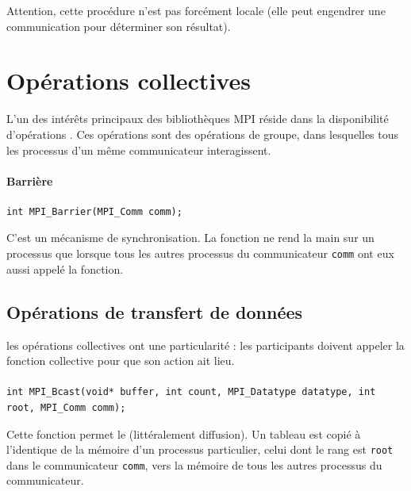 Attention, cette procédure n'est pas forcément locale (elle peut engendrer une
communication pour déterminer son résultat).




\section{Opérations collectives}

L'un des intérêts principaux des bibliothèques MPI réside dans la
disponibilité d'opérations . Ces opérations
sont des opérations de groupe, dans lesquelles tous les processus d'un
même communicateur interagissent.

\paragraph{Barrière}

\begin{verbatim}
int MPI_Barrier(MPI_Comm comm);
\end{verbatim}

C'est un mécanisme de synchronisation. La fonction ne rend la main sur
un processus que lorsque tous les autres processus du communicateur
\verb|comm| ont eux aussi appelé la fonction.

\subsection{Opérations de transfert de données}

 les opérations collectives ont une particularité :
 les participants doivent appeler la fonction
collective pour que son action ait lieu.


\paragraph{\og {}\fg}

\begin{verbatim}
int MPI_Bcast(void* buffer, int count, MPI_Datatype datatype, int root, MPI_Comm comm);
\end{verbatim}

Cette fonction permet le \og {}\fg (littéralement \og
diffusion\fg). Un tableau est copié à l'identique de la mémoire d'un
processus particulier, celui dont le rang est \verb|root| dans le
communicateur \verb|comm|, vers la mémoire de tous les autres
processus du communicateur.


